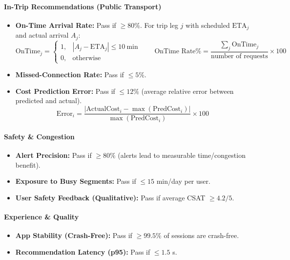 \paragraph{\textbf{In-Trip Recommendations (Public Transport)}}
\begin{itemize}
	\item \textbf{On-Time Arrival Rate:} Pass if $\ge 80\%$. For trip leg $j$ with scheduled $\mathrm{ETA}_j$ and actual arrival $A_j$:
	\[\text{OnTime}_j = \begin{cases}
		1, & |A_j - \mathrm{ETA}_j| \le 10\ \text{min} \\
		0, & \text{otherwise}
	\end{cases}\qquad
		\text{OnTime Rate\%} = \frac{\sum_j \text{OnTime}_j}{\text{number of requests}} \times 100\]
	\item \textbf{Missed-Connection Rate:} Pass if $\le 5\%$.
	\item \textbf{Cost Prediction Error:} Pass if $\le 12\%$ (average relative error between predicted and actual).\\
	\[\text{Error}_i = \frac{\big|\mathrm{ActualCost}_i - \max(\mathrm{PredCost}_i)\big|}{\max(\mathrm{PredCost}_i)} \times 100\]
\end{itemize}

\paragraph{\textbf{Safety \& Congestion}}
\begin{itemize}
	\item \textbf{Alert Precision:} Pass if $\ge 80\%$ (alerts lead to measurable time/congestion benefit).
	\item \textbf{Exposure to Busy Segments:} Pass if $\le 15$ min/day per user.
	\item \textbf{User Safety Feedback (Qualitative):} Pass if average CSAT $\ge 4.2/5$.
\end{itemize}

\paragraph{\textbf{Experience \& Quality}}
\begin{itemize}
	\item \textbf{App Stability (Crash-Free):} Pass if $\ge 99.5\%$ of sessions are crash-free.
	\item \textbf{Recommendation Latency (p95):} Pass if $\le 1.5$ s.
\end{itemize}
